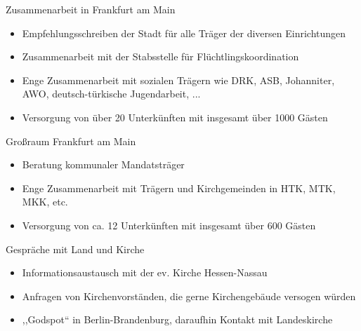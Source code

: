 \documentclass[t]{beamer}
\begin{document}
  \begin{frame}{Zusammenarbeit in Frankfurt am Main}
    \begin{itemize}
      \item Empfehlungsschreiben der Stadt für alle Träger der diversen Einrichtungen
      \item Zusammenarbeit mit der Stabsstelle für Flüchtlingskoordination
      \item Enge Zusammenarbeit mit sozialen Trägern wie DRK, ASB, Johanniter, AWO, deutsch-türkische Jugendarbeit, ...
      \item Versorgung von über 20 Unterkünften mit insgesamt über 1000 Gästen
    \end{itemize}
  \end{frame}

  \begin{frame}{Großraum Frankfurt am Main}
    \begin{itemize}
      \item Beratung kommunaler Mandatsträger
      \item Enge Zusammenarbeit mit Trägern und Kirchgemeinden in HTK, MTK, MKK, etc.
      \item Versorgung von ca. 12 Unterkünften mit insgesamt über 600 Gästen
    \end{itemize}
  \end{frame}

  \begin{frame}{Gespräche mit Land und Kirche}
    \begin{itemize}
      \item Informationsaustausch mit der ev. Kirche Hessen-Nassau
      \item Anfragen von Kirchenvorständen, die gerne Kirchengebäude versogen würden
      \item ,,Godspot`` in Berlin-Brandenburg, daraufhin Kontakt mit Landeskirche
    \end{itemize}
  \end{frame}



\end{document}
